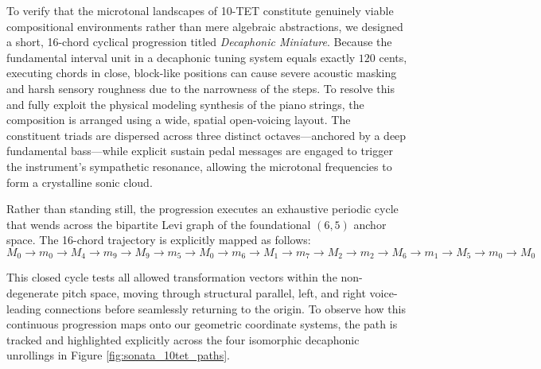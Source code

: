\documentclass[11pt,letterpaper]{amsart}
\begin{document}
To verify that the microtonal landscapes of 10-TET constitute genuinely viable compositional environments rather than mere algebraic abstractions, we designed a short, 16-chord cyclical progression titled \textit{Decaphonic Miniature}. Because the fundamental interval unit in a decaphonic tuning system equals exactly $120$ cents, executing chords in close, block-like positions can cause severe acoustic masking and harsh sensory roughness due to the narrowness of the steps. To resolve this and fully exploit the physical modeling synthesis of the piano strings, the composition is arranged using a wide, spatial open-voicing layout. The constituent triads are dispersed across three distinct octaves---anchored by a deep fundamental bass---while explicit sustain pedal messages are engaged to trigger the instrument's sympathetic resonance, allowing the microtonal frequencies to form a crystalline sonic cloud.

Rather than standing still, the progression executes an exhaustive periodic cycle that wends across the bipartite Levi graph of the foundational $(6,5)$ anchor space. The 16-chord trajectory is explicitly mapped as follows:
{\tiny \begin{equation}
 M_0 \to m_0 \to M_4 \to m_9 \to M_9 \to m_5 \to M_0 \to m_6 \to M_1 \to m_7 \to M_2 \to m_2 \to M_6 \to m_1 \to M_5 \to m_0 \to M_0
\end{equation}}

This closed cycle tests all allowed transformation vectors within the non-degenerate pitch space, moving through structural parallel, left, and right voice-leading connections before seamlessly returning to the origin. To observe how this continuous progression maps onto our geometric coordinate systems, the path is tracked and highlighted explicitly across the four isomorphic decaphonic unrollings in Figure \ref{fig:sonata_10tet_paths}.
\end{document}
